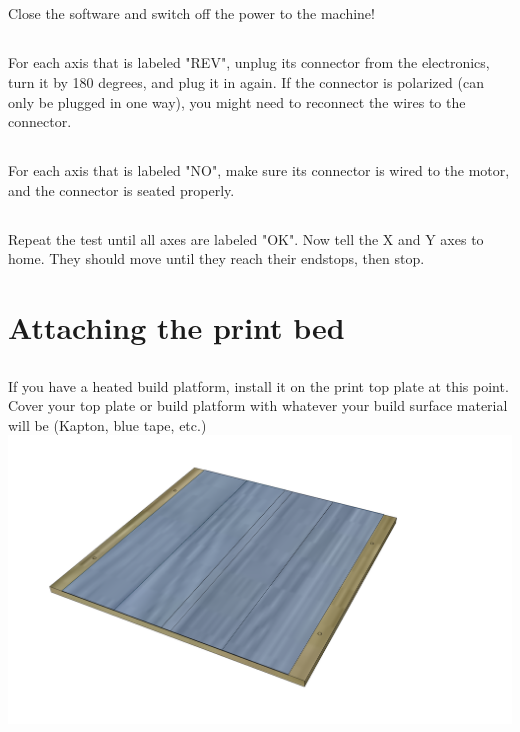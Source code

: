 \documentclass[twoside,a4paper,titlepage]{memoir}
\begin{document}
	\section{}
	Close the software and switch off the power to the machine!
	
	\section{}
	For each axis that is labeled "REV", unplug its connector from the electronics, turn it by 180 degrees,
	and plug it in again. If the connector is polarized (can only be plugged in one way), you might need to
	reconnect the wires to the connector.
	
	\section{}
	For each axis that is labeled "NO", make sure its connector is wired to the motor, and the connector is
	seated properly.
	
	\section{}
	Repeat the test until all axes are labeled "OK". Now tell the X and Y axes to home. They should move
	until they reach their endstops, then stop.
	
	\chapter{Attaching the print bed}
	
	\section{}
	If you have a heated build platform, install it on the print top plate at this point. Cover your top plate or
	build platform with whatever your build surface material will be (Kapton, blue tape, etc.)
	\includegraphics[width=1\linewidth]{graphics/ch11_1.png}
	
\end{document}
